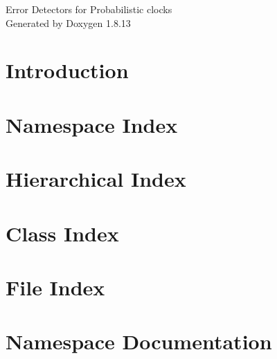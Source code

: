 \documentclass[twoside]{book}
\newcommand{\+}{\discretionary{\mbox{\scriptsize$\hookleftarrow$}}{}{}}
\newcommand{\clearemptydoublepage}{%
  \newpage{\pagestyle{empty}\cleardoublepage}%
}
\begin{document}
\hypersetup{pageanchor=false,
             bookmarksnumbered=true,
             pdfencoding=unicode
            }
\begin{titlepage}
\vspace*{7cm}
\begin{center}%
{\Large Error Detectors for Probabilistic clocks }\\
\vspace*{1cm}
{\large Generated by Doxygen 1.8.13}\\
\end{center}
\end{titlepage}
\clearemptydoublepage
{}
\tableofcontents
\clearemptydoublepage
{}
\hypersetup{pageanchor=true}

\chapter{Introduction}
\label{index}\hypertarget{index}{}
\chapter{Namespace Index}

\chapter{Hierarchical Index}

\chapter{Class Index}

\chapter{File Index}

\chapter{Namespace Documentation}

\end{document}
